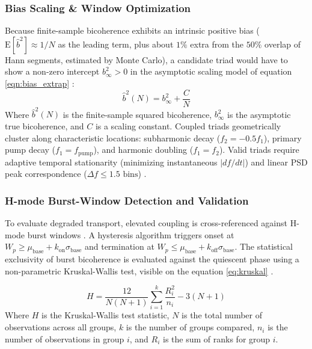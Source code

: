 \subsubsection{Bias Scaling \& Window Optimization}
Because finite-sample bicoherence exhibits an intrinsic positive bias ($\text{E}[\hat{b}^2] \approx 1/N$ as the leading term, plus about $1\%$ extra from the $50\%$ overlap of Hann segments, estimated by Monte Carlo), a candidate triad would have to show a non-zero intercept $b_\infty^2 > 0$ in the asymptotic scaling model of equation \ref{eqn:bias_extrap} \cite{HinichWolinsky2005}:
\begin{equation}
\label{eqn:bias_extrap}
\hat{b}^2(N) = b_\infty^2 + \frac{C}{N}
\end{equation}
Where $\hat{b}^2(N)$ is the finite-sample squared bicoherence, $b_\infty^2$ is the asymptotic true bicoherence, and $C$ is a scaling constant. Coupled triads geometrically cluster along characteristic locations: subharmonic decay ($f_2 = -0.5f_1$), primary pump decay ($f_1 = f_{\text{pump}}$), and harmonic doubling ($f_1 = f_2$). Valid triads require adaptive temporal stationarity (minimizing instantaneous $|df/dt|$) and linear PSD peak correspondence ($\Delta f \le 1.5\text{ bins}$) \cite{HinichWolinsky2005}. 

\subsubsection{H-mode Burst-Window Detection and Validation}
To evaluate degraded transport, elevated coupling is cross-referenced against H-mode burst windows \cite{Kin2025, Miyashita2025}. A hysteresis algorithm triggers onset at $W_p \ge \mu_{\text{base}} + k_{\text{on}} \sigma_{\text{base}}$ and termination at $W_p \le \mu_{\text{base}} + k_{\text{off}} \sigma_{\text{base}}$. The statistical exclusivity of burst bicoherence is evaluated against the quiescent phase using a non-parametric Kruskal-Wallis test, visible on the equation \ref{eq:kruskal} \cite{shumway2017time, james2021statistical}. 

\begin{equation} \label{eq:kruskal}
H = \frac{12}{N(N+1)} \sum_{i=1}^{k} \frac{R_i^2}{n_i} - 3(N+1)
\end{equation}
Where $H$ is the Kruskal-Wallis test statistic, $N$ is the total number of observations across all groups, $k$ is the number of groups compared, $n_i$ is the number of observations in group $i$, and $R_i$ is the sum of ranks for group $i$.

